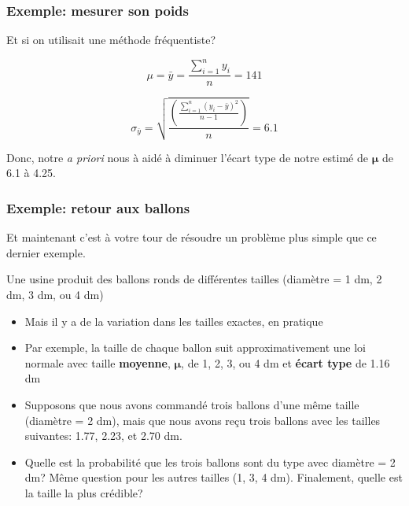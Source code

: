 \documentclass{beamer}
\begin{document}
\begin{frame}
    \frametitle{Exemple: mesurer son poids}
    Et si on utilisait une méthode fréquentiste?

    \pause

    \vfill

    \[\mu = \bar{y} = \frac{\sum_{i=1}^{n} y_i}{n} = 141\]

    \pause

    \vfill

    \[\sigma_{\bar{y}} = \sqrt{\frac{\left(\frac{\sum_{i=1}^{n} (y_i - \bar{y})^2}{n-1}\right)}{n}} = 6.1\]

    \pause

    \vfill

    Donc, notre \emph{a priori} nous à aidé à diminuer l'écart type de notre estimé de $\boldsymbol{\mu}$
    de 6.1 à 4.25.
\end{frame}


\begin{frame}
    \frametitle{Exemple: retour aux ballons}
    Et maintenant c'est à votre tour de résoudre un problème plus simple que ce dernier exemple.

    \pause

    \vfill

    Une usine produit des ballons ronds de différentes tailles (diamètre = 1 dm, 2 dm, 3 dm, ou 4 dm) \pause
    \begin{itemize}
      \item Mais il y a de la variation dans les tailles exactes, en pratique
      \pause
      \item Par exemple, la taille de chaque ballon suit approximativement une loi normale avec
            taille \textbf{moyenne}, $\boldsymbol{\mu}$, de 1, 2, 3, ou 4 dm et \textbf{écart type} de 1.16 dm
      \pause
      \item Supposons que nous avons commandé trois ballons d'une même taille (diamètre = 2 dm),
            mais que nous avons reçu trois ballons avec les tailles suivantes: 1.77, 2.23, et 2.70 dm.
      \pause
      \item Quelle est la probabilité que les trois ballons sont du type avec diamètre = 2 dm?
            Même question pour les autres tailles (1, 3, 4 dm). Finalement, quelle est la
            taille la plus crédible?
    \end{itemize}
\end{frame}
\end{document}
